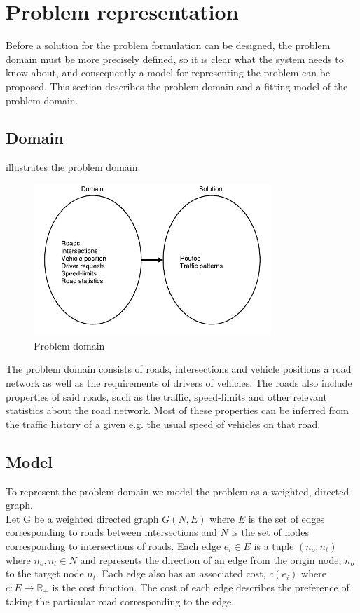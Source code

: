 \section{Problem representation}
Before a solution for the problem formulation can be designed, the problem domain must be more precisely defined, so it is clear what the system needs to know about, and consequently a model for representing the problem can be proposed. This section describes the problem domain and a fitting model of the problem domain.

\subsection*{Domain}
 illustrates the problem domain. 
\begin{figure}[h!]
  \centering
    \includegraphics[width=0.8\textwidth]{figures/pd.pdf}
    \caption{Problem domain}
    \label{fig:problem-domain}
\end{figure}
The problem domain consists of roads, intersections and vehicle positions a road network as well as the requirements of drivers of vehicles. The roads also include properties of said roads, such as the traffic, speed-limits and other relevant statistics about the road network. Most of these properties can be inferred from the traffic history of a given e.g. the usual speed of vehicles on that road.

\subsection*{Model}
To represent the problem domain we model the problem as a weighted, directed graph. \\
Let G be a weighted directed graph $G(N,E)$ where $E$ is the set of edges corresponding to roads between intersections and $N$ is the set of nodes corresponding to intersections of roads. Each edge $e_i \in E$ is a tuple $(n_o, n_t)$ where $n_o, n_t \in N$ and represents the direction of an edge from the origin node, $n_o$ to the target node $n_t$. Each edge also has an associated cost, $c(e_i)$ where  $c: E \rightarrow \mathbb R_+$ is the cost function. The cost of each edge describes the preference of taking the particular road corresponding to the edge. 

